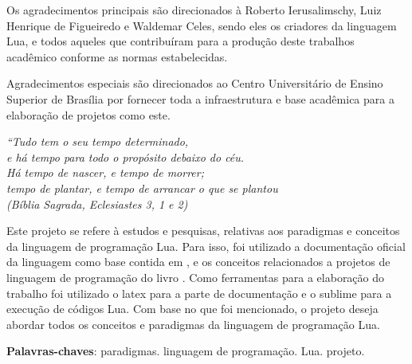 \documentclass[
12pt, %
openright, %
oneside, %
a4paper, %
english, %
brazil, %
]{abntex2}
\begin{document}
\begin{agradecimentos}
Os agradecimentos principais são direcionados à Roberto Ierusalimschy, Luiz Henrique de Figueiredo e Waldemar Celes, sendo eles os criadores da linguagem Lua, e todos aqueles que contribuíram para a produção deste trabalhos acadêmico conforme
as normas estabelecidas.

Agradecimentos especiais são direcionados ao Centro Universitário de Ensino Superior de Brasília por fornecer toda a infraestrutura e base acadêmica para a elaboração de projetos como este.

\end{agradecimentos}

\begin{epigrafe}
    \vspace*{\fill}
\begin{flushright}
\textit{``Tudo tem o seu tempo determinado, \\
e há tempo para todo o propósito debaixo do céu. \\
Há tempo de nascer, e tempo de morrer; \\
tempo de plantar, e tempo de arrancar o que se plantou\\
(Bíblia Sagrada, Eclesiastes 3, 1 e 2)}
\end{flushright}
\end{epigrafe}


\begin{resumo}
Este projeto se refere à estudos e pesquisas, relativas aos paradigmas e conceitos da linguagem de programação Lua. Para isso, foi utilizado a documentação oficial da linguagem como base contida em \cite{Lua_Org}, e os conceitos relacionados a projetos de linguagem de programação do livro \cite{Sebesta}. Como ferramentas para a elaboração do trabalho foi utilizado o latex para a parte de documentação e o sublime para a execução de códigos Lua. Com base no que foi mencionado, o projeto deseja abordar todos os conceitos e paradigmas da linguagem de programação Lua.

 \noindent
 \textbf{Palavras-chaves}: paradigmas. linguagem de programação. Lua. projeto.
\end{resumo}
\end{document}
